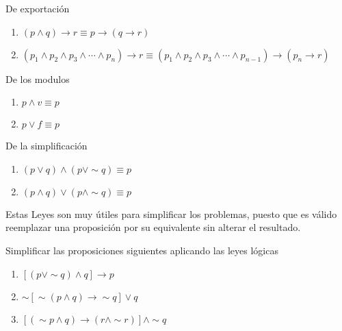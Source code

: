 \begin{ley}{De exportación}
\begin{enumerate}
\item $\left(p\wedge q\right)\rightarrow r\equiv p\rightarrow\left(q\rightarrow r\right)$
\item $\left(p_{1}\wedge p_{2}\wedge p_{3}\wedge\cdots\wedge p_{n}\right)\rightarrow r\equiv\left(p_{1}\wedge p_{2}\wedge p_{3}\wedge\cdots\wedge p_{n-1}\right)\rightarrow\left(p_{n}\rightarrow r\right)$
\end{enumerate}
\end{ley}

\begin{ley}{De los modulos}
\begin{enumerate}
\item $p\wedge v\equiv p$ 
\item $p\vee f\equiv p$
\end{enumerate}
\end{ley}

\begin{ley}{De la simplificación}
\begin{enumerate}
\item $\left(p\vee q\right)\wedge\left(p\vee\sim q\right)\equiv p$
\item $\left(p\wedge q\right)\vee\left(p\wedge\sim q\right)\equiv p$
\end{enumerate}
\end{ley}

\nota Estas Leyes son muy útiles para simplificar los problemas,
puesto que es válido reemplazar una proposición por su equivalente
sin alterar el resultado. 

\begin{ejems}{}

Simplificar las proposiciones siguientes aplicando las leyes lógicas 
\begin{enumerate}
\item $\left[\left(p\vee\sim q\right)\wedge q\right]\rightarrow p$
\item $\sim\left[\sim\left(p\wedge q\right)\rightarrow\sim q\right]\vee q$
\item $\left[\left(\sim p\wedge q\right)\rightarrow\left(r\wedge\sim r\right)\right]\wedge\sim q$
\end{enumerate}
\end{ejems}

